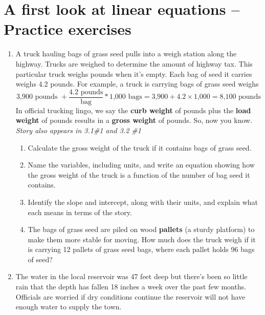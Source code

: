 \section{A first look at linear equations -- Practice exercises}

\begin{enumerate}

\item A truck hauling bags of grass seed pulls into a weigh station along the highway.  Trucks are weighed to determine the amount of highway tax.  This particular truck weighs  pounds when it's empty.  Each bag of seed it carries weighs 4.2 pounds. 
For example, a truck is carrying  bags of grass seed weighs 
$$\text{3,900 pounds } + \frac{4.2 \text{ pounds}}{\text{bag}} \ast \text{1,000  bags} = \text{3,900} + 4.2\times\text{1,000}=\text{8,100 pounds}$$ 
In official trucking lingo, we  say the \textbf{curb weight} of  pounds plus the \textbf{load weight} of  pounds results in a \textbf{gross weight} of  pounds.  So, now you know.  \hfill \emph{Story also appears in 3.1\#1 and 3.2 \#1}
\begin{enumerate}
\item Calculate the gross weight of the truck if it contains  bags of grass seed.   \vfill
\item Name the variables, including units, and  write an equation showing how the gross weight of the truck is a function of the number of bag seed it contains.  \vfill
\item Identify the slope and intercept, along with their units, and explain what each means in terms of the story. \vfill
\item The bags of grass seed are piled on wood \textbf{pallets} (a sturdy platform) to make them more stable for moving. How much does the truck weigh if it is carrying 12 pallets of grass seed bags, where each pallet holds 96 bags of seed?    \vfill
\end{enumerate}

\newpage %

\item The water in the local reservoir was 47 feet deep but there's been so little rain that the depth has fallen 18 inches a week over the past few months.  Officials are worried if dry conditions continue the reservoir will not have enough water to supply the town.  


\end{enumerate}
